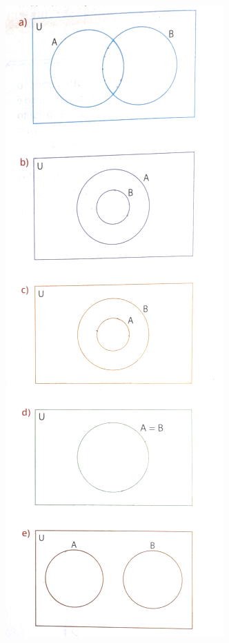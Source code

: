 \documentclass[a4paper,14pt]{article}
\begin{document}
\begin{multicols}{2}
\begin{enumerate}
    				\includegraphics[width=1\linewidth]{imagens_6FMA51/imagem1}

\end{enumerate}
\end{multicols}
\end{document}
